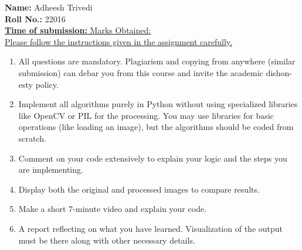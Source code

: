 \documentclass[12pt, a4paper]{exam}
\begin{document}
\par
\vspace{0.2in}
\noindent
\textbf{Name: }Adheesh Trivedi\\
\noindent
\textbf{Roll No.:  }22016\\
\noindent
\uline{\textbf{Time of submission: } \hfill 		\hfill Marks Obtained: } \\
\uline{Please follow the instructions given in the assignment carefully.}
\par 
\vspace{0.15in}
\noindent
\centering
{\small \bfseries
\begin{enumerate}
    \item All questions are mandatory. Plagiarism and copying from anywhere (similar
    submission) can debar you from this course and invite the academic dishon-
    esty policy.
    \item Implement all algorithms purely in Python without using specialized libraries
    like OpenCV or PIL for the processing. You may use libraries for basic
    operations (like loading an image), but the algorithms should be coded from
    scratch.
    \item Comment on your code extensively to explain your logic and the steps you
    are implementing.
    \item Display both the original and processed images to compare results.
    \item Make a short 7-minute video and explain your code.
    \item A report reflecting on what you have learned. Visualization of the output
    must be there along with other necessary details.
\end{enumerate}
}
\end{document}
